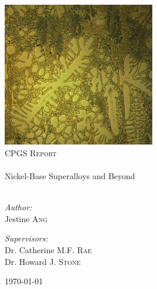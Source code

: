 \begin{titlepage}
\begin{center}

\includegraphics[width=0.5\textwidth]{logo.jpg}\\[3cm]

\textsc{\Large CPGS Report}\\[0.5cm]
\HRule \\[0.5cm]
{ \huge Nickel-Base Superalloys and Beyond}\\[0.3cm]
\HRule \\[1.5cm]
\begin{minipage}{0.4\textwidth}
\begin{flushleft} \large
\emph{Author:}\\
Jestine \textsc{Ang}
\end{flushleft}
\end{minipage}
\begin{minipage}{0.4\textwidth}
\begin{flushright} \large
\emph{Supervisors:} \\
Dr. Catherine M.F. \textsc{Rae}\\
Dr. Howard J. \textsc{Stone}
\end{flushright}
\end{minipage}
\vfill
{\large \today}
\end{center}
\end{titlepage}